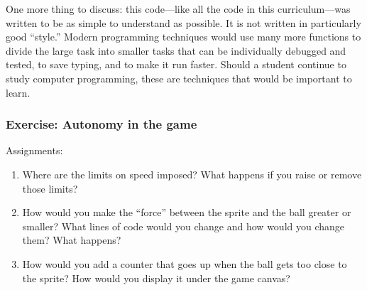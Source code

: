 \documentclass[11pt]{article}
\begin{document}
One more thing to discuss: this code---like all the code in this
curriculum---was written to be as simple to understand as possible.
It is not written in particularly good ``style.''  Modern programming
techniques would use many more functions to divide the large task into
smaller tasks that can be individually debugged and tested, to save
typing, and to make it run faster.  Should a student continue to study
computer programming, these are techniques that would be important to
learn.


\vspace{-10pt}
\subsubsection{Exercise: Autonomy in the game}


Assignments:

\vspace{-10pt}
\begin{enumerate}

\item Where are the limits on speed imposed?  What happens if you
  raise or remove those limits?

\item How would you make the ``force'' between the sprite and the ball
  greater or smaller?  What lines of code would you change and how
  would you change them?  What happens?

\item How would you add a counter that goes up when the ball gets too
  close to the sprite?  How would you display it under the game canvas?

\end{enumerate}

\cleardoublepage
{}
\printindex
\end{document}
